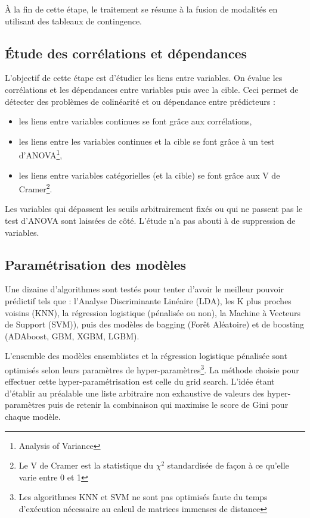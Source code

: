 \documentclass[french]{article}
\begin{document}
\begin{multicols}{2}
À la fin de cette étape, le traitement se résume à la fusion de modalités en utilisant des tableaux de contingence.

\subsection{Étude des corrélations et dépendances}

L'objectif de cette étape est d'étudier les liens entre variables. On évalue les corrélations et les dépendances entre variables puis avec la cible. Ceci permet de détecter des problèmes de colinéarité et ou dépendance entre prédicteurs :

\begin{itemize}
    \item les liens entre variables continues se font grâce aux corrélations,
    \item les liens entre les variables continues et la cible se font grâce à un test d'ANOVA\footnote{Analysis of Variance},
    \item les liens entre variables catégorielles (et la cible) se font grâce aux V de Cramer\footnote{Le V de Cramer est la statistique du $\chi^2$ standardisée de façon à ce qu'elle varie entre 0 et 1}.
\end{itemize}

Les variables qui dépassent les seuils arbitrairement fixés ou qui ne passent pas le test d'ANOVA sont laissées de côté. L'étude n'a pas abouti à de suppression de variables.

\subsection{Paramétrisation des modèles}

Une dizaine d'algorithmes sont testés pour tenter d'avoir le meilleur pouvoir prédictif tels que : l'Analyse Discriminante Linéaire (LDA), les K plus proches voisins (KNN), la régression logistique (pénalisée ou non), la Machine à Vecteurs de Support (SVM)), puis des modèles de bagging (Forêt Aléatoire) et de boosting (ADAboost, GBM, XGBM, LGBM).

L'ensemble des modèles ensemblistes et la régression logistique pénalisée sont optimisés selon leurs paramètres de hyper-paramètres\footnote{Les algorithmes KNN et SVM ne sont pas optimisés faute du temps d'exécution nécessaire au calcul de matrices immenses de distance}. La méthode choisie pour effectuer cette hyper-paramétrisation est celle du \og grid search\fg. L'idée étant d'établir au préalable une liste arbitraire non exhaustive de valeurs des hyper-paramètres puis de retenir la combinaison qui maximise le score de Gini pour chaque modèle. 


\end{multicols}
\end{document}

